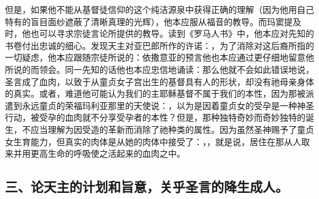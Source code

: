 但是，如果他不能从基督徒信仰的这个纯洁源泉中获得正确的理解（因为他用自己特有的盲目面纱遮蔽了清晰真理的光辉），他本应服从福音的教导。而玛窦提及时，他也可以寻求宗徒言论所提供的教导。读到《罗马人书》中，他本应对先知的书卷付出忠诚的细心。发现天主对亚巴郎所作的许诺：，为了消除对这后裔所指的一切疑虑，他本应跟随宗徒所说的：依撒意亚的预言他也本应通过更仔细地留意他所说的而领会。同一先知的话他也本应忠信地诵读：那么他就不会如此错误地说，圣言成了血肉，以致于从童贞女子宫出生的基督具有人的形状，却没有祂母亲身体的真实。或者，难道他可能认为我们的主耶稣基督不属于我们的本性，因为那被派遣到永远童贞的荣福玛利亚那里的天使说：，以为是因着童贞女的受孕是一种神圣行动，被受孕的血肉就不分享受孕者的本性？但是，那种独特奇妙而奇妙独特的诞生，不应当理解为因受造的革新而消除了祂种类的属性。因为虽然圣神赐予了童贞女生育能力，但真实的肉体是从她的肉体中接受了：，，就是说，居住在那从人取来并用更高生命的呼吸使之活起来的血肉之中。\par


\subsection{三、论天主的计划和旨意，关乎圣言的降生成人。}

